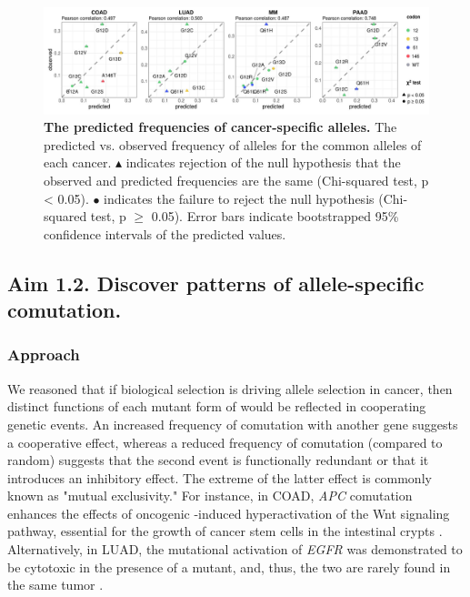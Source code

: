 \begin{figure}[ht]
\centering
\includegraphics[width=180mm]{figures/aim1/Fig_2.jpeg}
\caption{
    \textbf{The predicted frequencies of cancer-specific \KRAS{} alleles.}
    The predicted vs. observed frequency of \KRAS{} alleles for the common alleles of each cancer. $\blacktriangle$ indicates rejection of the null hypothesis that the observed and predicted frequencies are the same (Chi-squared test, p < 0.05). $\bullet$ indicates the failure to reject the null hypothesis (Chi-squared test, p $\ge$ 0.05). Error bars indicate bootstrapped 95\% confidence intervals of the predicted values.
}
\label{fig:obs-vs-pred}
\end{figure}



\subsection*{Aim 1.2. Discover patterns of allele-specific comutation.}


\subsubsection*{Approach}

We reasoned that if biological selection is driving \KRAS{} allele selection in cancer, then distinct functions of each mutant form of \kras{} would be reflected in cooperating genetic events. 
An increased frequency of comutation with another gene suggests a cooperative effect, whereas a reduced frequency of comutation (compared to random) suggests that the second event is functionally redundant or that it introduces an inhibitory effect.
The extreme of the latter effect is commonly known as "mutual exclusivity."
For instance, in COAD, \emph{APC} comutation enhances the effects of oncogenic \KRAS{}-induced hyperactivation of the Wnt signaling pathway, essential for the growth of cancer stem cells in the intestinal crypts \cite{Janssen2006, Fearon2014, Sakai2018, Jauhri2017}.
Alternatively, in LUAD, the mutational activation of \emph{EGFR} was demonstrated to be cytotoxic in the presence of a \KRAS{} mutant, and, thus, the two are rarely found in the same tumor \cite{Unni2015EvidenceAdenocarcinoma., Ambrogio2017InAdenocarcinoma.}.

